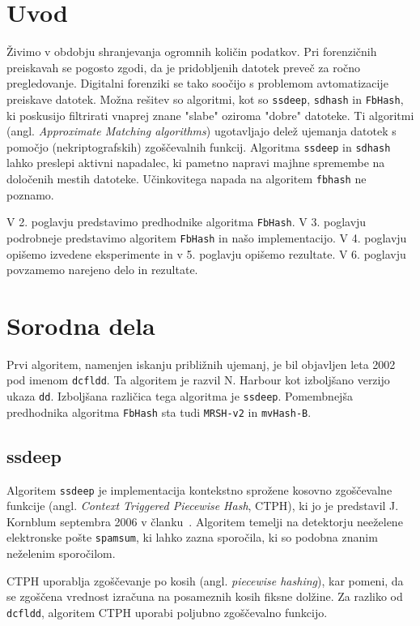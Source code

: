 \documentclass{acm_proc_article-sp}
\begin{document}
\section{Uvod}
Živimo v obdobju shranjevanja ogromnih količin podatkov. Pri forenzičnih preiskavah se pogosto zgodi, da je pridobljenih datotek preveč za ročno pregledovanje. Digitalni forenziki se tako soočijo s problemom avtomatizacije preiskave datotek. Možna rešitev so algoritmi, kot so \texttt{ssdeep}, \texttt{sdhash} in \texttt{FbHash}, ki poskusijo filtrirati vnaprej znane "slabe" oziroma "dobre" datoteke. Ti algoritmi (angl. \emph{Approximate Matching algorithms}) ugotavljajo delež ujemanja datotek s pomočjo (nekriptografskih) zgoščevalnih funkcij. Algoritma \texttt{ssdeep} in \texttt{sdhash} lahko preslepi aktivni napadalec, ki pametno napravi majhne spremembe na določenih mestih datoteke. Učinkovitega napada na algoritem \texttt{fbhash} ne poznamo.\cite{fbhash}

V 2. poglavju predstavimo predhodnike algoritma \texttt{FbHash}. V 3. poglavju podrobneje predstavimo algoritem \texttt{FbHash} in našo implementacijo. V 4. poglavju opišemo izvedene eksperimente in  v 5. poglavju opišemo rezultate. V 6. poglavju povzamemo narejeno delo in rezultate.

\section{Sorodna dela}
Prvi algoritem, namenjen iskanju približnih ujemanj, je bil objavljen leta 2002 pod imenom \texttt{dcfldd}. Ta algoritem je razvil N. Harbour kot izboljšano verzijo ukaza \texttt{dd}\cite{dcfldd}. Izboljšana različica tega algoritma je \texttt{ssdeep}. Pomembnejša predhodnika algoritma \texttt{FbHash} sta tudi \texttt{MRSH-v2} in \texttt{mvHash-B}.

\subsection{ssdeep}
Algoritem \texttt{ssdeep} je implementacija kontekstno sprožene kosovno zgoščevalne funkcije (angl. \emph{Context Triggered Piecewise Hash}, CTPH), ki jo je predstavil J. Kornblum septembra 2006 v članku~\cite{kornblum:ctph}. Algoritem temelji na detektorju neeželene elektronske pošte \texttt{spamsum}, ki lahko zazna sporočila, ki so podobna znanim neželenim sporočilom.

CTPH uporablja zgoščevanje po kosih (angl. \emph{piecewise hashing}), kar pomeni, da se zgoščena vrednost izračuna na posameznih kosih fiksne dolžine. Za razliko od \texttt{dcfldd}, algoritem CTPH uporabi poljubno zgoščevalno funkcijo.
\end{document}
